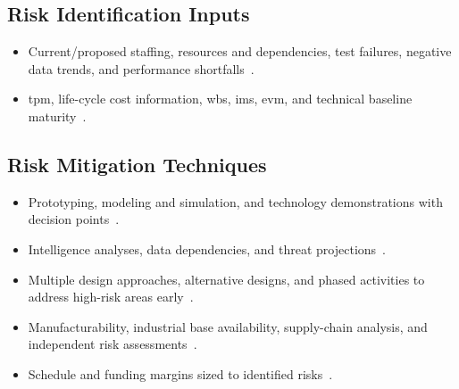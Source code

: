 \documentclass[../main.tex]{subfiles}
\begin{document}
\subsection{Risk Identification Inputs}
\begin{itemize}
  \item Current/proposed staffing, resources and dependencies, test failures, negative data trends, and performance shortfalls~\autocite{edo-3-3-6-risk-management-problem-solving-2025}.
  \item \ac{tpm}, life-cycle cost information, \ac{wbs}, \ac{ims}, \ac{evm}, and technical baseline maturity~\autocite{edo-3-3-6-risk-management-problem-solving-2025}.
\end{itemize}

\subsection{Risk Mitigation Techniques}
\begin{itemize}
  \item Prototyping, modeling and simulation, and technology demonstrations with decision points~\autocite{edo-3-3-6-risk-management-problem-solving-2025}.
  \item Intelligence analyses, data dependencies, and threat projections~\autocite{edo-3-3-6-risk-management-problem-solving-2025}.
  \item Multiple design approaches, alternative designs, and phased activities to address high-risk areas early~\autocite{edo-3-3-6-risk-management-problem-solving-2025}.
  \item Manufacturability, industrial base availability, supply-chain analysis, and independent risk assessments~\autocite{edo-3-3-6-risk-management-problem-solving-2025}.
  \item Schedule and funding margins sized to identified risks~\autocite{edo-3-3-6-risk-management-problem-solving-2025}.
\end{itemize}
\end{document}
